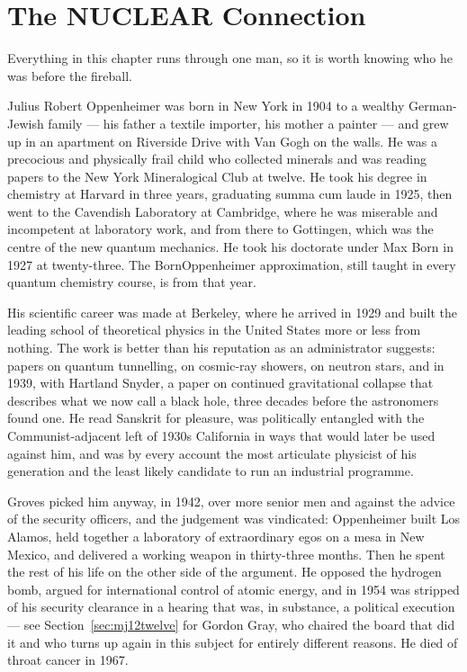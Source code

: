 \chapter{The NUCLEAR Connection}\label{ch:nuclear}


Everything in this chapter runs through one man, so it is worth knowing who he was before the
fireball.

Julius Robert Oppenheimer was born in New York in 1904 to a wealthy German-Jewish family --- his
father a textile importer, his mother a painter --- and grew up in an apartment on Riverside Drive
with Van Gogh on the walls. He was a precocious and physically frail child who collected minerals
and was reading papers to the New York Mineralogical Club at twelve. He took his degree in
chemistry at Harvard in three years, graduating summa cum laude in 1925, then went to the
Cavendish Laboratory at Cambridge, where he was miserable and incompetent at laboratory work, and
from there to Gottingen, which was the centre of the new quantum mechanics. He took his doctorate
under Max Born in 1927 at twenty-three. The Born\ndash{}Oppenheimer approximation, still taught in
every quantum chemistry course, is from that year.

His scientific career was made at Berkeley, where he arrived in 1929 and built the leading school
of theoretical physics in the United States more or less from nothing. The work is better than his
reputation as an administrator suggests: papers on quantum tunnelling, on cosmic-ray showers, on
neutron stars, and in 1939, with Hartland Snyder, a paper on continued gravitational collapse that
describes what we now call a black hole, three decades before the astronomers found one. He read
Sanskrit for pleasure, was politically entangled with the Communist-adjacent left of 1930s
California in ways that would later be used against him, and was by every account the most
articulate physicist of his generation and the least likely candidate to run an industrial
programme.

Groves picked him anyway, in 1942, over more senior men and against the advice of the security
officers, and the judgement was vindicated: Oppenheimer built Los Alamos, held together a
laboratory of extraordinary egos on a mesa in New Mexico, and delivered a working weapon in
thirty-three months. Then he spent the rest of his life on the other side of the argument. He
opposed the hydrogen bomb, argued for international control of atomic energy, and in 1954 was
stripped of his security clearance in a hearing that was, in substance, a political execution ---
see Section~\ref{sec:mj12twelve} for Gordon Gray, who chaired the board that did it and who turns
up again in this subject for entirely different reasons. He died of throat cancer in 1967.

